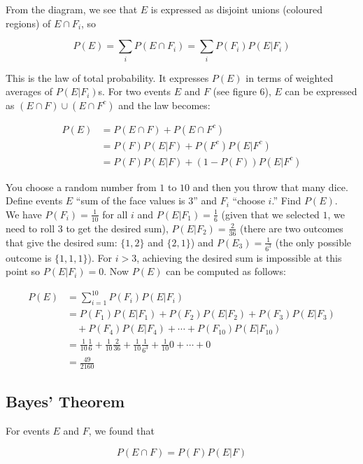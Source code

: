 \documentclass[12pt, a4paper]{article}
\newcounter{exa}
\begin{document}
From the diagram, we see that $E$ is expressed as disjoint unions (coloured regions) of $E \cap F_i$, so

$$P(E)=\sum_i P(E \cap F_i) = \sum_i P(F_i) P(E|F_i)$$

This is the law of total probability. It expresses $P(E)$ in terms of weighted averages of $P(E|F_i)$s. For two events $E$ and $F$ (see figure 6), $E$ can be expressed as $(E\cap F) \cup (E\cap F^c)$ and the law becomes:

\begin{align*}
P(E)&=P(E \cap F)+P(E \cap F^c) \\
&=P(F) P(E|F) + P(F^c) P(E|F^c) \\
&=P(F) P(E|F) + (1-P(F)) P(E|F^c)
\end{align*}

\begin{texample}
You choose a random number from $1$ to $10$ and then you throw that many dice. Define events $E$ ``sum of the face values is $3$'' and $F_i$ ``choose $i$.'' Find $P(E)$. \\

We have $P(F_i)=\frac{1}{10}$ for all $i$ and $P(E|F_1)=\frac16$ (given that we selected $1$, we need to roll $3$ to get the desired sum), $P(E|F_2)=\frac{2}{36}$ (there are two outcomes that give the desired sum: $\{1,2\}$ and $\{2,1\}$) and $P(E_3)=\frac{1}{6^3}$ (the only possible outcome is $\{1,1,1\}$). For $i>3$, achieving the desired sum is impossible at this point so $P(E|F_i)=0$. Now $P(E)$ can be computed as follows:

\begin{align*}
P(E)&=\sum_{i=1}^{10} P(F_i) P(E|F_i) \\
&=P(F_1)P(E|F_1)+P(F_2)P(E|F_2)+P(F_3)P(E|F_3) \\
&\quad +P(F_4)P(E|F_4)+\cdots+P(F_{10})P(E|F_{10}) \\
&=\frac{1}{10}\frac16 + \frac{1}{10}\frac{2}{36}+\frac{1}{10}\frac{1}{6^3}+\frac{1}{10}0+\cdots+0 \\
&=\frac{49}{2160}
\end{align*}
\end{texample}

\subsection{Bayes' Theorem}

For events $E$ and $F$, we found that

$$P(E \cap F)=P(F)P(E|F)$$
\end{document}
